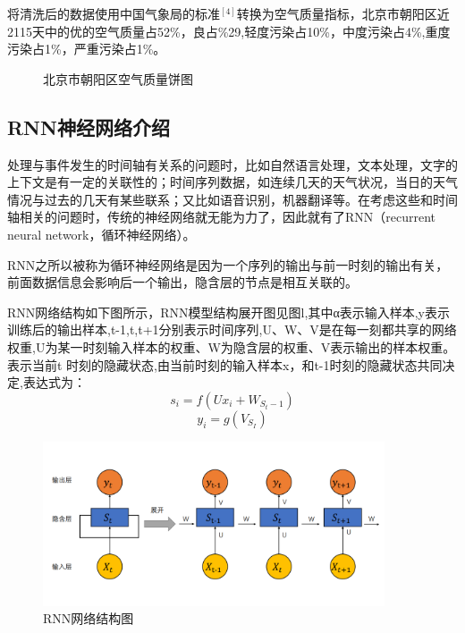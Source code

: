 \documentclass[UTF8]{ctexart}
\begin{document}
将清洗后的数据使用中国气象局的标准$^{[4]}$转换为空气质量指标，北京市朝阳区近2115天中的优的空气质量占52\%，良占\%29,轻度污染占10\%，中度污染占4\%,重度污染占1\%，严重污染占1\%。
\begin{figure}[H]
    \centering
    \caption{北京市朝阳区空气质量饼图}
\end{figure}

\subsection{RNN神经网络介绍}
处理与事件发生的时间轴有关系的问题时，比如自然语言处理，文本处理，文字的上下文是有一定的关联性的；时间序列数据，如连续几天的天气状况，当日的天气情况与过去的几天有某些联系；又比如语音识别，机器翻译等。在考虑这些和时间轴相关的问题时，传统的神经网络就无能为力了，因此就有了RNN（recurrent neural network，循环神经网络）。

RNN之所以被称为循环神经网络是因为一个序列的输出与前一时刻的输出有关，前面数据信息会影响后一个输出，隐含层的节点是相互关联的。

RNN网络结构如下图所示，RNN模型结构展开图见图l,其中α表示输入样本,y表示训练后的输出样本,t-1,t,t+1分别表示时间序列,U、W、V是在每一刻都共享的网络权重,U为某一时刻输入样本的权重、W为隐含层的权重、V表示输出的样本权重。 表示当前t 时刻的隐藏状态,由当前时刻的输入样本x，和t-1时刻的隐藏状态共同决定,表达式为：
\begin{equation}
    s_i=f(Ux_i+W_{S_t-1})
\end{equation}
\begin{equation}
    y_i=g(V_{S_I})
\end{equation}

\begin{figure}[H] %
    \centering %
    \includegraphics[width=0.9\textwidth]{./picture/RNMNetStructural.png} %
    \caption{RNN网络结构图} 
\end{figure}
\end{document}
